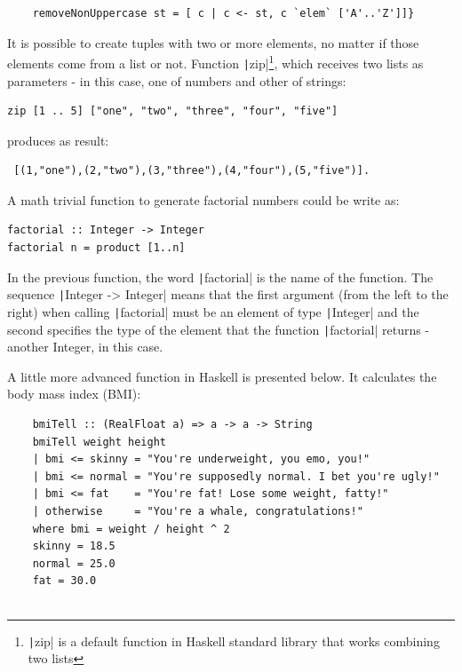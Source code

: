 \documentclass[oneside,12pt]{scrbook}
\newcommand{\haskell}[1]{\texttt|#1|}
\theoremstyle{definition}
\theoremstyle{plain}
\theoremstyle{definition}
\begin{document}
\begin{verbatim}
	removeNonUppercase st = [ c | c <- st, c `elem` ['A'..'Z']]}
\end{verbatim}

It is possible to create tuples with two or more elements, no matter if those elements come from a list or not. Function \haskell{zip}\footnote{\haskell{zip} is a default function in Haskell standard library that works combining two lists}, which receives two lists as parameters - in this case, one of numbers and other of strings:

\begin{verbatim}
zip [1 .. 5] ["one", "two", "three", "four", "five"]
\end{verbatim}

 produces as result:
 
 \begin{verbatim}
 [(1,"one"),(2,"two"),(3,"three"),(4,"four"),(5,"five")].
 \end{verbatim}

A math trivial function to generate factorial numbers could be write as:

\begin{verbatim}
factorial :: Integer -> Integer  
factorial n = product [1..n]
\end{verbatim}

In the previous function, the word \haskell{factorial} is the name of the function. The sequence \haskell{Integer -> Integer} means that the first argument (from the left to the right) when calling \haskell{factorial} must be an element of type \haskell{Integer} and the second specifies the type of the element that the function \haskell{factorial} returns - another Integer, in this case.

A little more advanced function in Haskell is presented below. It calculates the body mass index (BMI):

\begin{verbatim}
	bmiTell :: (RealFloat a) => a -> a -> String  
	bmiTell weight height  
	| bmi <= skinny = "You're underweight, you emo, you!"  
	| bmi <= normal = "You're supposedly normal. I bet you're ugly!"  
	| bmi <= fat    = "You're fat! Lose some weight, fatty!"  
	| otherwise     = "You're a whale, congratulations!"  
	where bmi = weight / height ^ 2  
	skinny = 18.5  
	normal = 25.0  
	fat = 30.0 
	
\end{verbatim}
\end{document}
